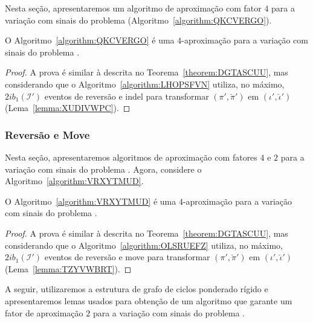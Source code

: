 Nesta seção, apresentaremos um algoritmo de aproximação com fator $4$ para a variação com sinais do problema \SbIRI{} (Algoritmo~\ref{algorithm:QKCVERGO}).



\begin{theorem}\label{theorem:CLXFCZMR}
O Algoritmo~\ref{algorithm:QKCVERGO} é uma $4$-aproximação para a variação com sinais do problema \SbIRI{}.
\end{theorem}
\begin{proof}
A prova é similar à descrita no Teorema~\ref{theorem:DGTASCUU}, mas considerando que o Algoritmo~\ref{algorithm:LHOPSFVN} utiliza, no máximo, $2ib_1(\mathcal{I'})$ eventos de reversão e indel para transformar $(\pi',\breve\pi')$ em $(\iota',\breve\iota')$ (Lema~\ref{lemma:XUDIVWPC}).
\end{proof}

\subsubsection{Reversão e Move}

Nesta seção, apresentaremos algoritmos de aproximação com fatores $4$ e $2$ para a variação com sinais do problema \SbIRM{}. Agora, considere o Algoritmo~\ref{algorithm:VRXYTMUD}.



\begin{theorem}\label{theorem:KJSCUFTB}
O Algoritmo~\ref{algorithm:VRXYTMUD} é uma $4$-aproximação para a variação com sinais do problema \SbIRM{}.
\end{theorem}
\begin{proof}
A prova é similar à descrita no Teorema~\ref{theorem:DGTASCUU}, mas considerando que o Algoritmo~\ref{algorithm:OLSRUEFZ} utiliza, no máximo, $2ib_1(\mathcal{I'})$ eventos de reversão e move para transformar $(\pi',\breve\pi')$ em $(\iota',\breve\iota')$ (Lema~\ref{lemma:TZYVWBRT}).
\end{proof}

A seguir, utilizaremos a estrutura de grafo de ciclos ponderado rígido e apresentaremos lemas usados para obtenção de um algoritmo que garante um fator de aproximação $2$ para a variação com sinais do problema \SbIRM{}.

